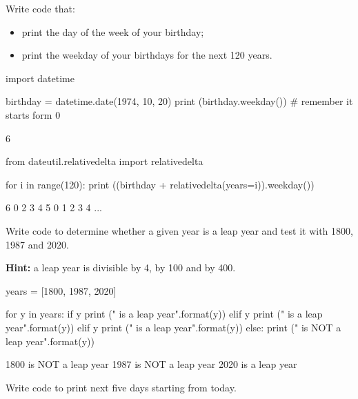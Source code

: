 \begin{question}
Write code that:

\begin{itemize}
\item print the day of the week of your birthday;
\item print the weekday of your birthdays for the next 120 years.
\end{itemize}
\end{question}

\begin{solution}
\end{solution}	
\begin{ipython}
import datetime

birthday = datetime.date(1974, 10, 20)
print (birthday.weekday()) # remember it starts form 0

6

from dateutil.relativedelta import relativedelta

for i in range(120):
    print ((birthday + relativedelta(years=i)).weekday())

6
0
2
3
4
5
0
1
2
3
4
...
\end{ipython}

\begin{question}
Write code to determine whether a given year is a leap year and test it with 1800, 1987 and 2020.

\noindent\textbf{Hint:} a leap year is divisible by 4, by 100 and by 400.
\end{question}

\begin{solution}
\end{solution}

\begin{ipython}
years = [1800, 1987, 2020]

for y in years:
    if y %
        print ("{} is a leap year".format(y))
	elif y %
        print ("{} is a leap year".format(y)) 
    elif y %
        print ("{} is a leap year".format(y))
    else:
        print ("{} is NOT a leap year".format(y))

1800 is NOT a leap year
1987 is NOT a leap year
2020 is a leap year        
\end{ipython}  

\begin{question}
Write code to print next five days starting from today.
\end{question}

\begin{solution}
\end{solution}

